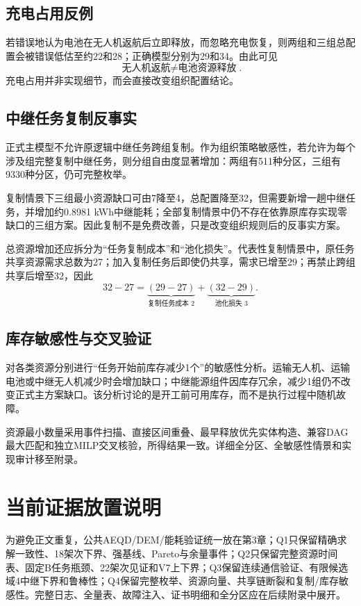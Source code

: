 \documentclass[UTF8,a4paper,12pt]{ctexart}
\begin{document}
\subsection{充电占用反例}

若错误地认为电池在无人机返航后立即释放，而忽略充电恢复，则两组和三组总配置会被错误低估至约22和28；正确模型分别为29和34。由此可见
\[
\boxed{
\text{无人机返航}
\neq
\text{电池资源释放}
}.
\]
充电占用并非实现细节，而会直接改变组织配置结论。

\subsection{中继任务复制反事实}

正式主模型不允许原逻辑中继任务跨组复制。作为组织策略敏感性，若允许为每个涉及组完整复制中继任务，则分组自由度显著增加：两组有511种分区，三组有9330种分区，仍可完整枚举。

复制情景下三组最小资源缺口可由7降至4，总配置降至32，但需要新增一趟中继任务，并增加约0.8981 kWh中继能耗；全部复制情景中仍不存在依靠原库存实现零缺口的三组方案。因此复制不是免费改善，只是改变组织规则后的反事实方案。

总资源增加还应拆分为“任务复制成本”和“池化损失”。代表性复制情景中，原任务共享资源需求总数为27；加入复制任务后即使仍共享，需求已增至29；再禁止跨组共享后增至32，因此
\[
32-27
=
\underbrace{(29-27)}_{\text{复制任务成本 }2}
+
\underbrace{(32-29)}_{\text{池化损失 }3}.
\]

\subsection{库存敏感性与交叉验证}

对各类资源分别进行“任务开始前库存减少1个”的敏感性分析。运输无人机、运输电池或中继无人机减少时会增加缺口；中继能源组件因库存冗余，减少1组仍不改变正式主方案缺口。该分析讨论的是开工前可用库存，而不是执行过程中随机故障。

资源最小数量采用事件扫描、直接区间重叠、最早释放优先实体构造、兼容DAG最大匹配和独立MILP交叉核验，所得结果一致。详细全分区、全敏感性情景和实现审计移至附录。

\section*{当前证据放置说明}

为避免正文重复，公共AEQD/DEM/能耗验证统一放在第3章；Q1只保留精确求解一致性、18架次下界、强基线、Pareto与余量事件；Q2只保留完整资源时间表、固定B任务瓶颈、22架次见证和V7上下界；Q3保留连续通信验证、有限候选域4中继下界和鲁棒性；Q4保留完整枚举、资源向量、共享链断裂和复制/库存敏感性。完整日志、全量表、故障注入、证书明细和全分区应在后续附录中展开。
\end{document}
